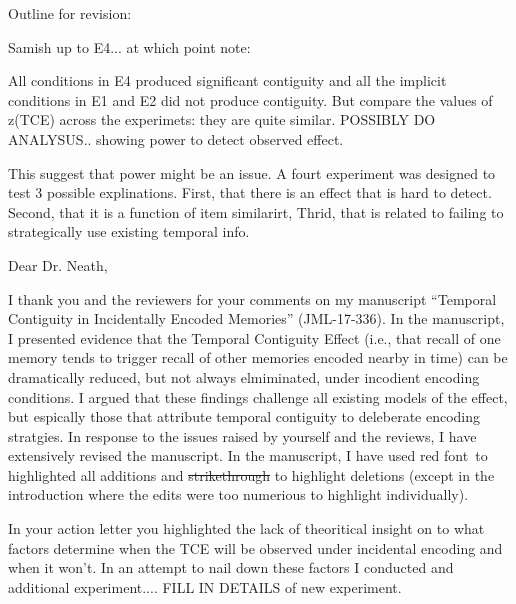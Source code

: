 \documentclass[12pt]{article}
\begin{document}



Outline for revision:

Samish up to E4... at which point note:

All conditions in E4 produced significant contiguity and all the implicit conditions in E1 and E2 did not produce contiguity. But compare the values of z(TCE) across the experimets: they are quite similar. POSSIBLY DO ANALYSUS.. showing power to detect observed effect.

This suggest that power might be an issue. A fourt experiment was designed to test 3 possible explinations. First, that there is an effect that is hard to detect. Second, that it is a function of item similarirt, Thrid, that is related to failing to strategically use existing temporal info.




Dear Dr. Neath,
 

I thank you and the reviewers for your comments on my manuscript  ``Temporal Contiguity in Incidentally Encoded Memories'' (JML-17-336). In the manuscript, I presented evidence that the Temporal Contiguity Effect (i.e., that recall of one memory tends to trigger recall of other memories encoded nearby in time) can be dramatically reduced, but not always elmiminated, under incodient encoding conditions. I argued that these findings challenge all existing models of the effect, but espically those that attribute temporal contiguity to deleberate encoding stratgies. In response to the issues raised by yourself and the reviews, I have extensively revised the manuscript. In the manuscript, I have used  \color{red}red font\color{black}~to highlighted all additions and \st{strikethrough} to highlight deletions (except in the introduction where the edits were too numerious to highlight individually).


In your action letter you highlighted the lack of theoritical insight on to what factors determine when the TCE will be observed under incidental encoding and when it won't. In an attempt to nail down these factors I conducted and additional experiment.... FILL IN DETAILS of new experiment.
\end{document}
